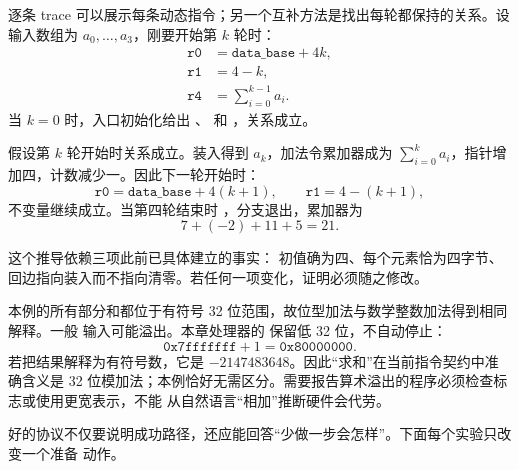 \begin{center}
\end{center}


逐条 trace 可以展示每条动态指令；另一个互补方法是找出每轮都保持的关系。设输入数组为
\(a_0,\ldots,a_3\)，刚要开始第 \(k\) 轮时：
\[
\begin{aligned}
\texttt{r0} &= \texttt{data\_base}+4k,\\
\texttt{r1} &= 4-k,\\
\texttt{r4} &= \sum_{i=0}^{k-1}a_i.
\end{aligned}
\]
当 \(k=0\) 时，入口初始化给出 、 和
，关系成立。

假设第 \(k\) 轮开始时关系成立。装入得到 \(a_k\)，加法令累加器成为
\(\sum_{i=0}^{k}a_i\)，指针增加四，计数减少一。因此下一轮开始时：
\[
\texttt{r0}=\texttt{data\_base}+4(k+1),\qquad
\texttt{r1}=4-(k+1),
\]
不变量继续成立。当第四轮结束时 ，分支退出，累加器为
\[
7+(-2)+11+5=21.
\]

这个推导依赖三项此前已具体建立的事实： 初值确为四、每个元素恰为四字节、
回边指向装入而不指向清零。若任何一项变化，证明必须随之修改。


本例的所有部分和都位于有符号 32 位范围，故位型加法与数学整数加法得到相同解释。一般
输入可能溢出。本章处理器的  保留低 32 位，不自动停止：
\[
\texttt{0x7fffffff}+1=\texttt{0x80000000}.
\]
若把结果解释为有符号数，它是 \(-2147483648\)。因此“求和”在当前指令契约中准确含义是
32 位模加法；本例恰好无需区分。需要报告算术溢出的程序必须检查标志或使用更宽表示，不能
从自然语言“相加”推断硬件会代劳。


好的协议不仅要说明成功路径，还应能回答“少做一步会怎样”。下面每个实验只改变一个准备
动作。


